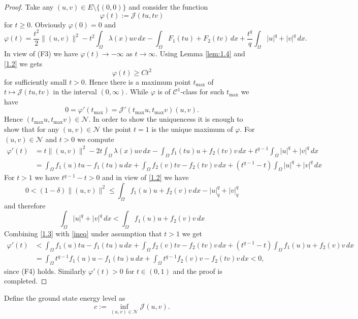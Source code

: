 \documentclass{scrartcl}
\newcommand{\cC}{{\mathcal C}}
\newcommand{\cJ}{{\mathcal J}}
\newcommand{\cN}{{\mathcal N}}
\numberwithin{equation}{section}
\begin{document}
\begin{proof}
Take any $(u,v) \in E \setminus \{(0,0)\}$ and consider the function
$$
\varphi(t) := \cJ(tu,tv)
$$
for $t \geq 0$. Obviously $\varphi(0) = 0$ and
$$
\varphi(t) = \frac{t^2}{2} \|(u,v)\|^2 - t^2 \int_{\Omega} \lambda(x)uv \, dx - \int_{\Omega} F_1(tu) + F_2(tv) \, dx + \frac{t^q}{q} \int_{\Omega} |u|^q + |v|^q \, dx.
$$
In view of (F3) we have $\varphi(t) \to -\infty$ as $t \to \infty$. Using Lemma \ref{lem:1.4} and \eqref{1.2} we gets
$$
\varphi(t) \geq  C t^2
$$
for sufficiently small $t > 0$. Hence there is a maximum point $t_{\max}$ of $t \mapsto \cJ (tu,tv)$ in the interval $(0,\infty)$. While $\varphi$ is of $\cC^1$-class for such $t_{\max}$ we have
$$
0 = \varphi'(t_{\max}) = \cJ'(t_{\max} u, t_{\max} v) (u,v).
$$
Hence $(t_{\max} u, t_{\max} v) \in \cN$. In order to show the uniquencess it is enough to show that for any $(u,v) \in \cN$ the point $t=1$ is the unique maximum of $\varphi$. For $(u,v)  \in \cN$ and $t > 0$ we compute
\begin{align}
\varphi'(t) &= t \|(u,v)\|^2 - 2t \int_{\Omega} \lambda(x) uv \, dx - \int_{\Omega} f_1 (tu)u + f_2(tv)v \, dx + t^{q-1} \int_{\Omega} |u|^q + |v|^q \, dx \nonumber \\
&= \int_{\Omega} f_1(u)tu - f_1(tu)u \, dx + \int_{\Omega} f_2(v)tv - f_2(tv)v \, dx + (t^{q-1} - t) \int_{\Omega} |u|^q + |v|^q \, dx\label{1.3}
\end{align}
For $t > 1$ we have $t^{q-1} - t > 0$ and in view of \eqref{1.2} we have
$$
0 < (1-\delta) \|(u,v)\|^2 \leq \int_{\Omega} f_1(u)u + f_2(v)v \, dx - |u|_q^q + |v|_q^q
$$
and therefore
\begin{equation}\label{ineq}
\int_{\Omega} |u|^q + |v|^q \, dx < \int_{\Omega} f_1(u)u + f_2(v)v \, dx
\end{equation}
Combining \eqref{1.3} with \eqref{ineq} under assumption that $t > 1$ we get
\begin{align*}
\varphi'(t) &< \int_{\Omega} f_1(u)tu - f_1(tu)u \, dx + \int_{\Omega} f_2(v)tv - f_2(tv)v \, dx + (t^{q-1} - t) \int_{\Omega} f_1(u)u + f_2(v)v \, dx \\
&= \int_{\Omega} t^{q-1} f_1 (u)u - f_1(tu)u \, dx + \int_{\Omega} t^{q-1} f_2 (v)v - f_2(tv)v \, dx < 0,
\end{align*}
since (F4) holds. Similarly $\varphi'(t) > 0$ for $t \in (0,1)$ and the proof is completed.
\end{proof}

Define the ground state energy level as
$$
c := \inf_{(u,v) \in \cN} \cJ(u,v).
$$
\end{document}
